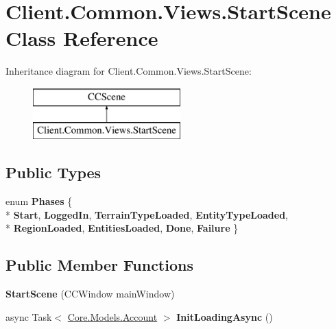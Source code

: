 \hypertarget{classClient_1_1Common_1_1Views_1_1StartScene}{\section{Client.\-Common.\-Views.\-Start\-Scene Class Reference}
\label{classClient_1_1Common_1_1Views_1_1StartScene}
}
Inheritance diagram for Client.\-Common.\-Views.\-Start\-Scene\-:\begin{figure}[H]
\begin{center}
\leavevmode
\includegraphics[height=2.000000cm]{classClient_1_1Common_1_1Views_1_1StartScene}
\end{center}
\end{figure}
\subsection*{Public Types}
\begin{DoxyCompactItemize}
\item 
enum {\bfseries Phases} \{ \\*
{\bfseries Start}, 
{\bfseries Logged\-In}, 
{\bfseries Terrain\-Type\-Loaded}, 
{\bfseries Entity\-Type\-Loaded}, 
\\*
{\bfseries Region\-Loaded}, 
{\bfseries Entities\-Loaded}, 
{\bfseries Done}, 
{\bfseries Failure}
 \}
\end{DoxyCompactItemize}
\subsection*{Public Member Functions}
\begin{DoxyCompactItemize}
\item 
\hypertarget{classClient_1_1Common_1_1Views_1_1StartScene_a9bb2c1aec787e16d9d2b4f6de0cc15fc}{{\bfseries Start\-Scene} (C\-C\-Window main\-Window)}\label{classClient_1_1Common_1_1Views_1_1StartScene_a9bb2c1aec787e16d9d2b4f6de0cc15fc}

\item 
\hypertarget{classClient_1_1Common_1_1Views_1_1StartScene_a7ddd4830c8ecf66c6f03b6e0b046dcee}{async Task$<$ \hyperlink{classCore_1_1Models_1_1Account}{Core.\-Models.\-Account} $>$ {\bfseries Init\-Loading\-Async} ()}\label{classClient_1_1Common_1_1Views_1_1StartScene_a7ddd4830c8ecf66c6f03b6e0b046dcee}

\end{DoxyCompactItemize}
